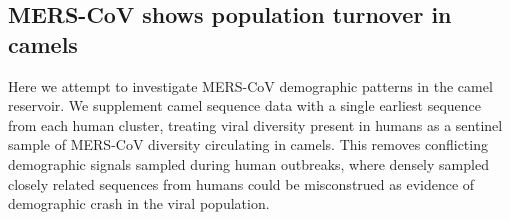 \documentclass[9pt,lineno]{elife}
\begin{document}

%


\subsection*{MERS-CoV shows population turnover in camels}

Here we attempt to investigate MERS-CoV demographic patterns in the camel reservoir.
We supplement camel sequence data with a single earliest sequence from each human cluster, treating viral diversity present in humans as a sentinel sample of MERS-CoV diversity circulating in camels.
This removes conflicting demographic signals sampled during human outbreaks, where densely sampled closely related sequences from humans could be misconstrued as evidence of demographic crash in the viral population.
\end{document}
